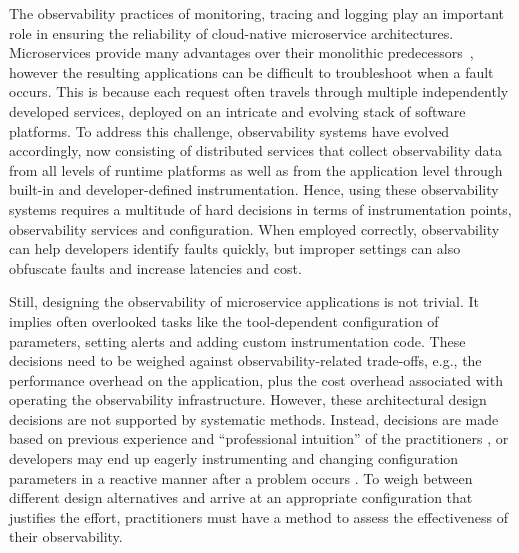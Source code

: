 The observability practices of monitoring, tracing and logging play an important role in ensuring the reliability of cloud-native microservice architectures. 
Microservices provide many advantages over their monolithic predecessors~\cite{Fowler_Microservices_2014}, however the resulting applications can be difficult to troubleshoot when a fault occurs\cite{Niedermaier_ObservabilityInterviewStudy_2019,Zhang_MicroserviceSurvey_ThresholdingHard_2019}. This is because each request often travels through multiple independently developed services, deployed on an intricate and evolving stack of software platforms. To address this challenge, observability systems have evolved accordingly, %
now consisting of distributed services that collect observability data from all levels of runtime platforms as well as from the application level through built-in and developer-defined instrumentation.
Hence, using these observability systems requires a multitude of hard decisions in terms of instrumentation points, observability services and configuration. 
When employed correctly, observability can help developers identify faults quickly, but improper settings can also obfuscate faults \cite{Zhang_MicroserviceSurvey_ThresholdingHard_2019,Borges_TracingServerless_2021} and increase latencies and cost.

Still, designing %
the observability of microservice applications is not trivial. It implies often overlooked tasks like the tool-dependent configuration of parameters, setting alerts and adding custom instrumentation code. These decisions need to be weighed against observability-related trade-offs, e.g., the performance overhead on the application, plus the cost overhead associated with operating the observability infrastructure.   %
However, these architectural design decisions are not supported by systematic methods. Instead, decisions are made based on previous experience and “professional intuition” of the practitioners \cite{Zhang_MicroserviceSurvey_ThresholdingHard_2019,Vale_MicroserviceQualityMeasurementIndustrySurvey_2022}, or developers may end up eagerly instrumenting and changing configuration parameters in a reactive manner after a problem occurs \cite{Niedermaier_ObservabilityInterviewStudy_2019}. To weigh between different design alternatives and arrive at an appropriate configuration that justifies the effort, practitioners must have a method to assess the effectiveness of their observability. 

